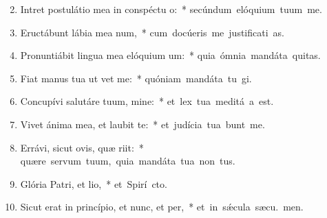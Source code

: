 \begin{flushleft}
\begin{enumerate}[leftmargin=*]
\setcounter{enumi}{1}

\item Intret postulátio mea in conspéctu o:~* \mbox{secúndum elóquium tuum  me.}
\item Eructábunt lábia mea num,~* \mbox{cum docúeris me justificati as.}
\item Pronuntiábit lingua mea elóquium um:~* \mbox{quia ómnia mandáta  \textaccent{\'{\ae}}quitas.}
\item Fiat manus tua ut vet me:~* \mbox{quóniam mandáta tu gi.}
\item Concupívi salutáre tuum, mine:~* \mbox{et lex tua meditá a est.}
\item Vivet ánima mea, et laubit te:~* \mbox{et judícia tua bunt me.}
\item Errávi, sicut ovis, quæ riit:~* \mbox{quære servum tuum, quia mandáta tua non  tus.}
\item Glória Patri, et lio,~* \mbox{et Spirí cto.}
\item Sicut erat in princípio, et nunc, et per,~* \mbox{et in s\'{\ae}cula sæcu. men.}


\end{enumerate}
\end{flushleft}

